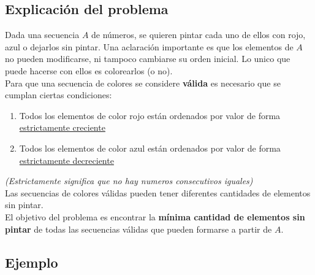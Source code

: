 \subsection{Explicación del problema}

Dada una secuencia $A$ de números, se quieren pintar cada uno de ellos con rojo, azul o dejarlos sin pintar. 
Una aclaración importante es que los elementos de $A$ no pueden modificarse, ni tampoco cambiarse su orden inicial. Lo unico que puede hacerse con ellos es colorearlos (o no).\\

Para que una secuencia de colores se considere \textbf{válida} es necesario que se cumplan ciertas condiciones:
\begin{enumerate}
\item Todos los elementos de color \textcolor{rojo}{rojo} están ordenados por valor de forma \underline{estrictamente creciente}
\item Todos los elementos de color \textcolor{azul}{azul} están ordenados por valor de forma \underline{estrictamente decreciente}
\end{enumerate}

\textit{(Estrictamente significa que no hay numeros consecutivos iguales)}\\

Las secuencias de colores válidas pueden tener diferentes cantidades de elementos sin pintar. \\
El objetivo del problema es encontrar la \textbf{mínima cantidad de elementos sin pintar} de todas las secuencias válidas que pueden formarse a partir de $A$. \\



\subsection{Ejemplo}

